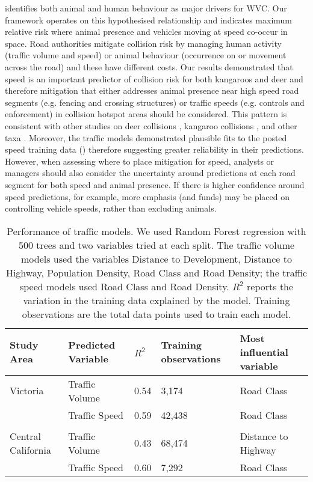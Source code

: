 \cite{form03} identifies both animal and human behaviour as major drivers for WVC.  Our framework operates on this hypothesised relationship and indicates maximum relative risk where animal presence and vehicles moving at speed co-occur in space.  Road authorities mitigate collision risk by managing human activity (traffic volume and speed) or animal behaviour (occurrence on or movement across the road) and these have different costs.  Our results demonstrated that speed is an important predictor of collision risk for both kangaroos and deer and therefore mitigation that either addresses animal presence near high speed road segments (e.g. fencing and crossing structures) or traffic speeds (e.g. controls and enforcement) in collision hotspot areas should be considered.  This pattern is consistent with other studies on deer collisions \citep[e.g.][]{gkri13,meis14,sudh09}, kangaroo collisions \citep[e.g.][]{rowd08}, and other taxa \citep[e.g.][]{guns11}.  Moreover, the traffic models demonstrated plausible fits to the posted speed training data () therefore suggesting greater reliability in their predictions.  However, when assessing where to place mitigation for speed, analysts or managers should also consider the uncertainty around predictions at each road segment for both speed and animal presence. If there is higher confidence around speed predictions, for example, more emphasis (and funds) may be placed on controlling vehicle speeds, rather than excluding animals.

\begin{table}[!h]
\caption[Performance of traffic models]{Performance of traffic models. We used Random Forest regression with 500 trees and two variables tried at each split. The traffic volume models used the variables Distance to Development, Distance to Highway, Population Density, Road Class and Road Density; the traffic speed models used Road Class and Road Density. $R^2$ reports the variation in the training data explained by the model. Training observations are the total data points used to train each model.}
\centering
\begin{tabularx}{0.9\textwidth}{lllll} \toprule
Study Area         	&Predicted Variable	& $R^2$	& Training observations		& Most influential variable \\ \midrule 
Victoria		 	& Traffic Volume	& 0.54 	& 3,174 					& Road Class \\ 
					& Traffic Speed		& 0.59	& 42,438 					& Road Class \\
&& \\ 
Central California	& Traffic Volume	& 0.43	& 68,474 					& Distance to Highway \\
			 		& Traffic Speed		& 0.60	& 7,292 					& Road Class \\
\bottomrule
\end{tabularx}
\label{cal_tmodel_perf}
\end{table}

